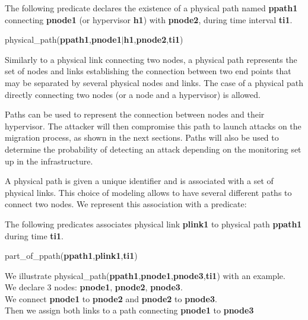 The following predicate declares the existence of a physical path named \textbf{ppath1} connecting \textbf{pnode1} (or hypervisor \textbf{h1}) with \textbf{pnode2}, during time interval \textbf{ti1}. 
\begin{myformula}
physical\_path(\textbf{ppath1},\textbf{pnode1}$\vert$\textbf{h1},\textbf{pnode2},\textbf{ti1})
\end{myformula}


Similarly to a physical link connecting two nodes, a physical path represents the set of nodes and links establishing the connection between two end points that may be separated by several physical nodes and links.
The case of a physical path directly connecting two nodes (or a node and a hypervisor) is allowed.

Paths can be used to represent the connection between nodes and their hypervisor.
The attacker will then compromise this path to launch attacks on the migration process, as shown in the next sections. Paths will also be used to determine the probability of detecting an attack depending on the monitoring set up in the infrastructure.

A physical path is given a unique identifier and is associated with a set of physical links. 
This choice of modeling allows to have several different paths to connect two nodes. 
We represent this association with a predicate:

The following predicates associates physical link \textbf{plink1} to physical path \textbf{ppath1} during time \textbf{ti1}.
\begin{myformula}
part\_of\_ppath(\textbf{ppath1},\textbf{plink1},\textbf{ti1})
\end{myformula}


We illustrate physical\_path(\textbf{ppath1},\textbf{pnode1},\textbf{pnode3},\textbf{ti1}) with an example.\\
We declare 3 nodes: \textbf{pnode1}, \textbf{pnode2}, \textbf{pnode3}.\\
We connect \textbf{pnode1} to \textbf{pnode2} and \textbf{pnode2} to \textbf{pnode3}.\\
Then we assign both links to a path connecting \textbf{pnode1} to \textbf{pnode3}

